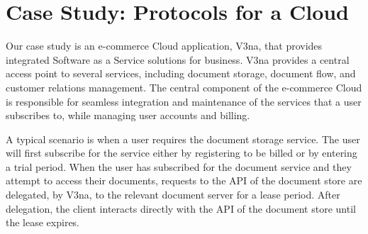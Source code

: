\documentclass[10pt]{llncs}
\begin{document}

\section{Case Study: Protocols for a Cloud}
\label{sect:impl}

Our case study is an e-commerce Cloud application, V3na, that provides integrated Software as a Service solutions for business. V3na provides a central access point to several services, including document storage, document flow, and customer relations management. 
The central component of the e-commerce Cloud is responsible for seamless integration and maintenance of the services that a user subscribes to, while managing user accounts and billing.

A typical scenario is when a user requires the document storage service. The user will first subscribe for the service either by registering to be billed or by entering a trial period. When the user has subscribed for the document service and they attempt to access their documents, requests to the API of the document store are delegated, by V3na, to the relevant document server for a lease period. After delegation, the client interacts directly with the API of the document store until the lease expires.
\end{document}
